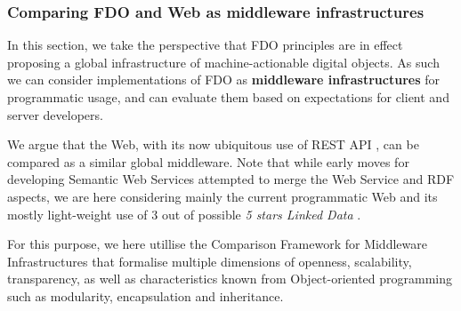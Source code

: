 \subsubsection{Comparing FDO and Web as middleware infrastructures}\label{ch3:middleware}

In this section, we take the perspective that FDO principles are in effect proposing a global infrastructure of machine-actionable digital objects. As such we can consider implementations of FDO as \textbf{middleware infrastructures} for programmatic usage, and can evaluate them based on expectations for client and server developers.

We argue that the Web, with its now ubiquitous use of REST API \cite{Fielding 2000}, can be compared as a similar global middleware. Note that while early moves for developing Semantic Web Services \cite{Fensel 2011} attempted to merge the Web Service and RDF aspects, we are here considering mainly the current programmatic Web and its mostly light-weight use of 3 out of possible \emph{5 stars Linked Data} \cite{Hausenblas 2012}.

For this purpose, we here utillise the Comparison Framework for Middleware Infrastructures \cite{Zarras 2004} that formalise multiple dimensions of openness, scalability, transparency, as well as characteristics known from Object-oriented programming such as modularity, encapsulation and inheritance.

